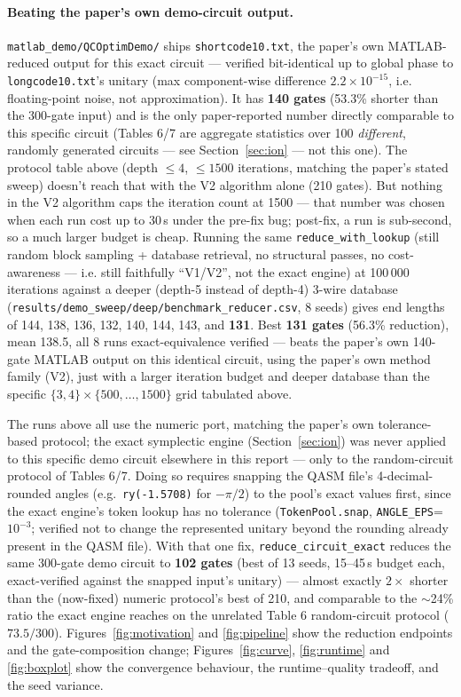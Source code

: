 \documentclass[11pt,a4paper]{article}
\begin{document}
\paragraph{Beating the paper's own demo-circuit output.}
\texttt{matlab\_demo/QCOptimDemo/} ships \texttt{shortcode10.txt}, the
paper's own MATLAB-reduced output for this exact circuit --- verified
bit-identical up to global phase to \texttt{longcode10.txt}'s unitary (max
component-wise difference $2.2\times10^{-15}$, i.e. floating-point noise,
not approximation). It has \textbf{140 gates} (53.3\% shorter than the
300-gate input) and is the only paper-reported number directly comparable
to this specific circuit (Tables 6/7 are aggregate statistics over 100
\emph{different}, randomly generated circuits --- see
Section~\ref{sec:ion} --- not this one). The protocol table above
(depth $\le 4$, $\le 1500$ iterations, matching the paper's stated sweep)
doesn't reach that with the V2 algorithm alone (210 gates). But nothing in
the V2 algorithm caps the iteration count at 1500 --- that number was
chosen when each run cost up to 30\,s under the pre-fix bug; post-fix, a
run is sub-second, so a much larger budget is cheap. Running the same
\texttt{reduce\_with\_lookup} (still random block sampling + database
retrieval, no structural passes, no cost-awareness --- i.e. still
faithfully ``V1/V2'', not the exact engine) at 100\,000 iterations against
a deeper (depth-5 instead of depth-4) 3-wire database
(\texttt{results/demo\_sweep/deep/benchmark\_reducer.csv}, 8 seeds) gives
end lengths of 144, 138, 136, 132, 140, 144, 143, and \textbf{131}. Best
\textbf{131 gates} (56.3\% reduction), mean 138.5, all 8 runs
exact-equivalence verified --- beats the paper's own 140-gate MATLAB output
on this identical circuit, using the paper's own method family (V2), just
with a larger iteration budget and deeper database than the specific
$\{3,4\}\times\{500,\ldots,1500\}$ grid tabulated above.

The runs above all use the numeric port, matching the paper's own
tolerance-based protocol; the exact symplectic engine (Section~\ref{sec:ion})
was never applied to this specific demo circuit elsewhere in this report ---
only to the random-circuit protocol of Tables 6/7. Doing so requires
snapping the QASM file's 4-decimal-rounded angles (e.g.\ \texttt{ry(-1.5708)}
for $-\pi/2$) to the pool's exact values first, since the exact engine's
token lookup has no tolerance (\texttt{TokenPool.snap},
\texttt{ANGLE\_EPS}=$10^{-3}$; verified not to change the represented
unitary beyond the rounding already present in the QASM file). With that
one fix, \texttt{reduce\_circuit\_exact} reduces the same 300-gate demo
circuit to \textbf{102 gates} (best of 13 seeds, 15--45\,s budget each,
exact-verified against the snapped input's unitary) --- almost exactly
$2\times$ shorter than the (now-fixed) numeric protocol's best of 210, and
comparable to the $\sim$24\% ratio the exact engine reaches on the
unrelated Table 6 random-circuit protocol ($73.5/300$). Figures~\ref{fig:motivation} and \ref{fig:pipeline} show the
reduction endpoints and the gate-composition change; Figures~\ref{fig:curve},
\ref{fig:runtime} and \ref{fig:boxplot} show the convergence behaviour, the
runtime--quality tradeoff, and the seed variance.
\end{document}
